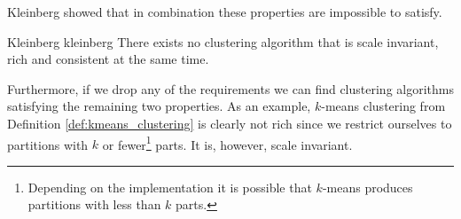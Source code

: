 Kleinberg showed that in combination these properties are impossible to satisfy.

\begin{theorem}{Kleinberg \cite[Thm.~2.1]{Kleinberg2002}}{kleinberg}
There exists no clustering algorithm that is scale invariant, rich and consistent at the same time.
\end{theorem}

Furthermore, if we drop any of the requirements we can find clustering algorithms satisfying the remaining two properties. As an example, $k$-means clustering from Definition \ref{def:kmeans_clustering} is clearly not rich since we restrict ourselves to partitions with $k$ or fewer\footnote{Depending on the implementation it is possible that $k$-means produces partitions with less than $k$ parts.} parts. It is, however, scale invariant.